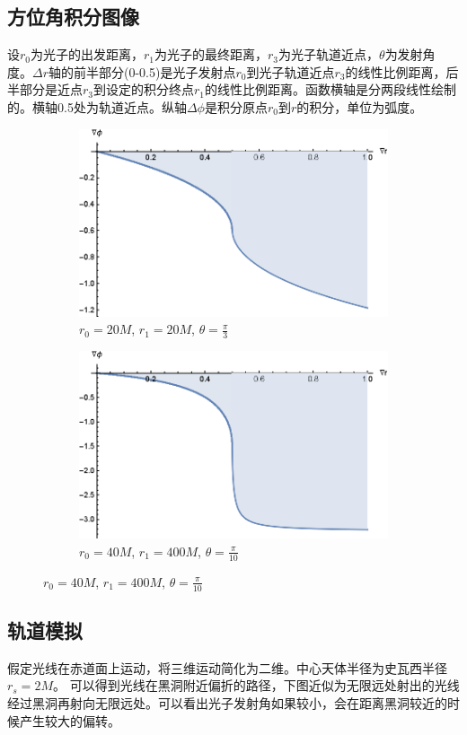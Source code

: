\subsection{方位角积分图像}
设$r_0$为光子的出发距离，$r_1$为光子的最终距离，$r_3$为光子轨道近点，$\theta$为发射角度。$\Delta r$轴的前半部分(0-0.5)是光子发射点$r_0$到光子轨道近点$r_3$的线性比例距离，后半部分是近点$r_3$到设定的积分终点$r_1$的线性比例距离。函数横轴是分两段线性绘制的。横轴0.5处为轨道近点。纵轴$\Delta\phi$是积分原点$r_0$到$r$的积分，单位为弧度。
\begin{figure}[htbp]
    \centering
    \begin{subfigure}{.5\textwidth}
        \centering
        \includegraphics[width=.8\linewidth]{images/dphi_1.eps}
        \caption{$r_0=20M$, $r_1=20M$, $\theta=\frac{\pi}{3}$}\label{dphi_1} %
    \end{subfigure}%
    \begin{subfigure}{.5\textwidth}
        \centering
        \includegraphics[width=.8\linewidth]{images/dphi_2.eps}
        \caption{$r_0=40M$, $r_1=400M$, $\theta=\frac{\pi}{10}$}\label{dphi_2} %
    \end{subfigure}
\end{figure}

\subsection{轨道模拟}
假定光线在赤道面上运动，将三维运动简化为二维。中心天体半径为史瓦西半径$r_s=2M$。
可以得到光线在黑洞附近偏折的路径，下图近似为无限远处射出的光线经过黑洞再射向无限远处。可以看出光子发射角如果较小，会在距离黑洞较近的时候产生较大的偏转。

